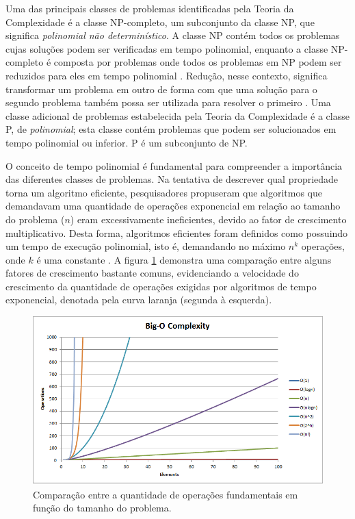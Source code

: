 \documentclass[12pt]{article}
\begin{document}
Uma das principais classes de problemas identificadas pela Teoria da Complexidade é a classe NP-completo, um subconjunto da classe NP, que significa \textit{polinomial não determinístico}. A classe NP contém todos os problemas cujas soluções podem ser verificadas em tempo polinomial, enquanto a classe NP-completo é composta por problemas onde todos os problemas em NP podem ser reduzidos para eles em tempo polinomial \cite{Garey1979}. Redução, nesse contexto, significa transformar um problema em outro de forma com que uma solução para o segundo problema também possa ser utilizada para resolver o primeiro \cite{Sipser1996}. Uma classe adicional de problemas estabelecida pela Teoria da Complexidade é a classe P, de \textit{polinomial}; esta classe contém problemas que podem ser solucionados em tempo polinomial ou inferior. P é um subconjunto de NP.

O conceito de tempo polinomial é fundamental para compreender a importância das diferentes classes de problemas. Na tentativa de descrever qual propriedade torna um algoritmo eficiente, pesquisadores propuseram que algoritmos que demandavam uma quantidade de operações exponencial em relação ao tamanho do problema ($n$) eram excessivamente ineficientes, devido ao fator de crescimento multiplicativo. Desta forma, algoritmos eficientes foram definidos como possuindo um tempo de execução polinomial, isto é, demandando no máximo $n^{k}$ operações, onde $k$ é uma constante \cite{Kleinberg2005}. A figura \ref{fig:complexity} demonstra uma comparação entre alguns fatores de crescimento bastante comuns, evidenciando a velocidade do crescimento da quantidade de operações exigidas por algoritmos de tempo exponencial, denotada pela curva laranja (segunda à esquerda).

\begin{figure}[ht]
    \centering
    \includegraphics[width=13cm]{complexity.png}
    \caption{Comparação entre a quantidade de operações fundamentais em função do tamanho do problema.}
    \label{fig:complexity}
\end{figure}
\end{document}

